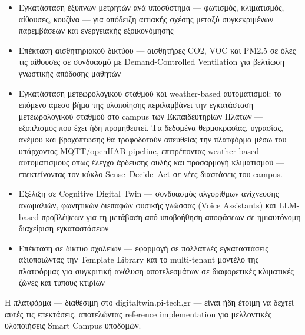 \begin{itemize}
\item Εγκατάσταση έξυπνων μετρητών ανά υποσύστημα --- φωτισμός, κλιματισμός, αίθουσες, κουζίνα --- για απόδειξη αιτιακής σχέσης μεταξύ συγκεκριμένων παρεμβάσεων και ενεργειακής εξοικονόμησης
\item Επέκταση αισθητηριακού δικτύου --- αισθητήρες \textlatin{CO2}, \textlatin{VOC} και \textlatin{PM2.5} σε όλες τις αίθουσες σε συνδυασμό με \textlatin{Demand-Controlled Ventilation} για βελτίωση γνωστικής απόδοσης μαθητών
\item Εγκατάσταση μετεωρολογικού σταθμού και \textlatin{weather-based} αυτοματισμοί: το επόμενο άμεσο βήμα της υλοποίησης περιλαμβάνει την εγκατάσταση μετεωρολογικού σταθμού στο \textlatin{campus} των Εκπαιδευτηρίων Πλάτων --- εξοπλισμός που έχει ήδη προμηθευτεί. Τα δεδομένα θερμοκρασίας, υγρασίας, ανέμου και βροχόπτωσης θα τροφοδοτούν απευθείας την πλατφόρμα μέσω του υπάρχοντος \textlatin{MQTT/openHAB} \textlatin{pipeline}, επιτρέποντας \textlatin{weather-based} αυτοματισμούς όπως έλεγχο άρδευσης αυλής και προσαρμογή κλιματισμού --- επεκτείνοντας τον κύκλο \textlatin{Sense--Decide--Act} σε νέες διαστάσεις του \textlatin{campus}.
\item Εξέλιξη σε \textlatin{Cognitive Digital Twin} --- συνδυασμός αλγορίθμων ανίχνευσης ανωμαλιών, φωνητικών διεπαφών φυσικής γλώσσας (\textlatin{Voice Assistants}) και \textlatin{LLM-based} προβλέψεων για τη μετάβαση από υποβοήθηση αποφάσεων σε ημιαυτόνομη διαχείριση εγκαταστάσεων
\item Επέκταση σε δίκτυο σχολείων --- εφαρμογή σε πολλαπλές εγκαταστάσεις αξιοποιώντας την \textlatin{Template Library} και το \textlatin{multi-tenant} μοντέλο της πλατφόρμας για συγκριτική ανάλυση αποτελεσμάτων σε διαφορετικές κλιματικές ζώνες και τύπους κτιρίων
\end{itemize}

Η πλατφόρμα --- διαθέσιμη στο \textlatin{digitaltwin.pi-tech.gr} --- είναι ήδη έτοιμη να δεχτεί αυτές τις επεκτάσεις, αποτελώντας \textlatin{reference implementation} για μελλοντικές υλοποιήσεις \textlatin{Smart Campus} υποδομών.
